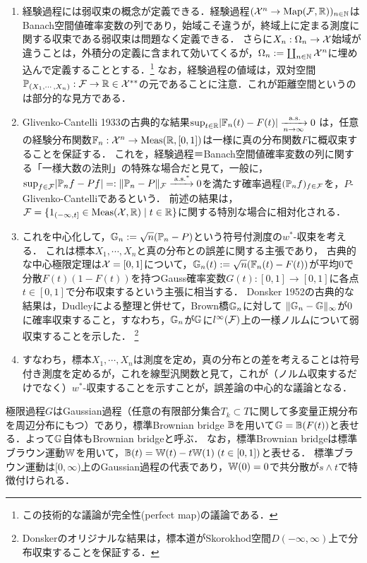 \documentclass[uplatex,dvipdfmx]{jsreport}
\begin{document}
\begin{enumerate}
    \item 経験過程には弱収束の概念が定義できる．経験過程$(\mathcal{X}^n\to\mathrm{Map}(\mathcal{F},\mathbb{R}))_{n\in\mathbb{N}}$はBanach空間値確率変数の列であり，始域こそ違うが，終域上に定まる測度に関する収束である弱収束は問題なく定義できる．
    さらに$X_n:\Omega_n\to\mathcal{X}$始域が違うことは，外積分の定義に含まれて効いてくるが，$\Omega_n:=\coprod_{n\in\mathbb{N}}\mathcal{X}^n$に埋め込んで定義することとする．\footnote{この技術的な議論が完全性(perfect map)の議論である．}
    なお，経験過程の値域は，双対空間$\mathbb{P}_{(X_1,\cdots,X_n)}:\mathcal{F}\to\mathbb{R}\in\mathcal{X}^{**}$の元であることに注意．これが距離空間というのは部分的な見方である．
    \item Glivenko-Cantelli 1933の古典的な結果$\sup_{t\in\mathbb{R}}\lvert\mathbb{F}_n(t)-F(t)\rvert\xrightarrow[n\to\infty]{\;\mathrm{a.s.}}0$
    は，任意の経験分布関数$\mathbb{F}_n:\mathcal{X}^n\to\mathrm{Meas}(\mathbb{R},[0,1])$は一様に真の分布関数$F$に概収束することを保証する．
    これを，経験過程＝Banach空間値確率変数の列に関する「一様大数の法則」の特殊な場合だと見て，一般に，$\sup_{f\in\mathcal{F}}\lvert\mathbb{P}_nf-Pf\rvert=:\|\mathbb{P}_n-P\|_{\mathcal{F}}\xrightarrow{\;\mathrm{a.s.}^*}0$を満たす確率過程$(\mathbb{P}_nf)_{f\in\mathcal{F}}$を，$P$-Glivenko-Cantelliであるという．
    前述の結果は，$\mathcal{F}=\{1_{(-\infty,t]}\in\mathrm{Meas}(\mathcal{X},\mathbb{R})\mid t\in\mathbb{R}\}$に関する特別な場合に相対化される．
    \item これを中心化して，$\mathbb{G}_n:=\sqrt{n}(\mathbb{P}_n-P)$という符号付測度の$w^*$-収束を考える．
    これは標本$X_1,\cdots,X_n$と真の分布との誤差に関する主張であり，
    古典的な中心極限定理は$\mathcal{X}=[0,1]$について，$\mathbb{G}_n(t):=\sqrt{n}(\mathbb{F}_n(t)-F(t))$が平均$0$で分散$F(t)(1-F(t))$を持つGauss確率変数$G(t):[0,1]\to[0,1]$に各点$t\in[0,1]$で分布収束するという主張に相当する．
    Donsker 1952の古典的な結果は，Dudleyによる整理と併せて，Brown橋$\mathbb{G}_n$に対して
    $\|\mathbb{G}_n-\mathbb{G}\|_\infty$が$0$に確率収束すること，すなわち，$\mathbb{G}_n$が$\mathbb{G}$に$l^\infty(\mathcal{F})$上の一様ノルムについて弱収束することを示した．
    \footnote{Donskerのオリジナルな結果は，標本道がSkorokhod空間$D(-\infty,\infty)$上で分布収束することを保証する．}
    \item すなわち，標本$X_1,\cdots,X_n$は測度を定め，真の分布との差を考えることは符号付き測度を定めるが，これを線型汎関数と見て，これが（ノルム収束するだけでなく）$w^*$-収束することを示すことが，誤差論の中心的な議論となる．
\end{enumerate}

\begin{discussion}
    極限過程$G$はGaussian過程（任意の有限部分集合$T_k\subset T$に関して多変量正規分布を周辺分布にもつ）であり，標準Brownian bridge $\mathbb{B}$を用いて$\mathbb{G}=\mathbb{B}(F(t))$と表せる．よって$\mathbb{G}$自体もBrownian bridgeと呼ぶ．
    なお，標準Brownian bridgeは標準ブラウン運動$\mathbb{W}$を用いて，$\mathbb{B}(t)=\mathbb{W}(t)-t\mathbb{W}(1)\;(t\in[0,1])$と表せる．
    標準ブラウン運動は$[0,\infty)$上のGaussian過程の代表であり，$\mathbb{W}(0)=0$で共分散が$s\land t$で特徴付けられる．
\end{discussion}
\end{document}
